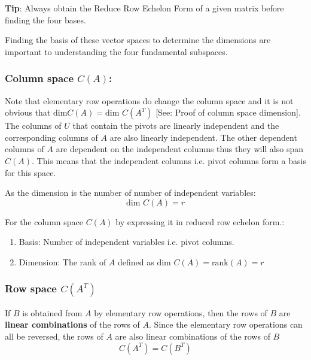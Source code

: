 \documentclass[10pt,a4paper]{article}
\begin{document}
\begin{tcolorbox}[breakable,colback=white]
\textbf{Tip}: Always obtain the Reduce Row Echelon Form of a given matrix before finding the four bases.
\end{tcolorbox}

Finding the basis of these vector spaces to determine the dimensions are important to understanding
the four fundamental subspaces.

\pagebreak
\subsubsection{Column space $C(A)$:}

Note that elementary row operations do change the column space and it is not obvious that $\text{dim
}C(A)=\text{dim }C(A^T)$ [See: Proof of column space dimension]. The columns of $U$ that contain the
pivots are  linearly  independent and the corresponding columns of $A$ are also linearly
independent. The other dependent columns of $A$ are dependent on the independent columns thus they
will also span $C(A)$. This means that the independent columns i.e. pivot columns form a basis for
this space. 

As the dimension is the number of number of independent variables:
$$
    \text{dim }C(A) = r
$$

\begin{tcolorbox}[breakable,colback=white]
    For the column space $C(A)$ by expressing it in reduced row echelon form.:
    \begin{enumerate}
        \item Basis: Number of independent variables i.e. pivot columns.
        \item Dimension: The rank of $A$ defined as $\text{dim }C(A)= \text{rank}(A) = r$ 
    \end{enumerate}
\end{tcolorbox}

\subsubsection{Row space $C(A^T)$}

If $B$ is obtained from $A$ by elementary row operations, then the rows of $B$ are \textbf{linear combinations} 
of  the rows of $A$. Since the elementary row operations can all be reversed, the rows of $A$ are also
linear combinations of the rows of $B$
$$
    C(A^T) = C(B^T)
$$
\end{document}
